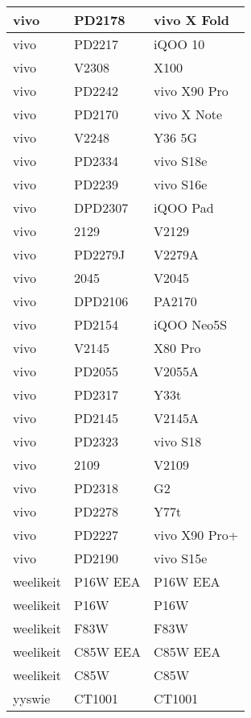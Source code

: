 \begin{tabularx}{\linewidth}{|l|X|X|}
        vivo & PD2178 & vivo X Fold \\ \hline
        vivo & PD2217 & iQOO 10 \\ \hline
        vivo & V2308 & X100 \\ \hline
        vivo & PD2242 & vivo X90 Pro \\ \hline
        vivo & PD2170 & vivo X Note \\ \hline
        vivo & V2248 & Y36 5G \\ \hline
        vivo & PD2334 & vivo S18e \\ \hline
        vivo & PD2239 & vivo S16e \\ \hline
        vivo & DPD2307 & iQOO Pad \\ \hline
        vivo & 2129 & V2129 \\ \hline
        vivo & PD2279J & V2279A \\ \hline
        vivo & 2045 & V2045 \\ \hline
        vivo & DPD2106 & PA2170 \\ \hline
        vivo & PD2154 & iQOO Neo5S \\ \hline
        vivo & V2145 & X80 Pro \\ \hline
        vivo & PD2055 & V2055A \\ \hline
        vivo & PD2317 & Y33t \\ \hline
        vivo & PD2145 & V2145A \\ \hline
        vivo & PD2323 & vivo S18 \\ \hline
        vivo & 2109 & V2109 \\ \hline
        vivo & PD2318 & G2 \\ \hline
        vivo & PD2278 & Y77t \\ \hline
        vivo & PD2227 & vivo X90 Pro+ \\ \hline
        vivo & PD2190 & vivo S15e \\ \hline
        weelikeit & P16W EEA & P16W EEA \\ \hline
        weelikeit & P16W & P16W \\ \hline
        weelikeit & F83W & F83W \\ \hline
        weelikeit & C85W EEA & C85W EEA \\ \hline
        weelikeit & C85W & C85W \\ \hline
        yyswie & CT1001 & CT1001 \\ \hline
\end{tabularx}